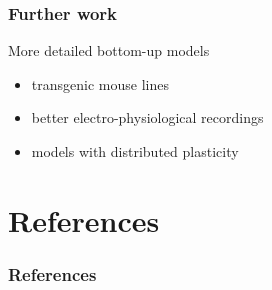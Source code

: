 \documentclass[10pt, compress]{beamer}
\begin{document}
\begin{frame}[fragile]
  \frametitle{Further work}
  More detailed bottom-up models
  \begin{itemize}
    \item transgenic mouse lines
    \item better electro-physiological recordings
    \item models with distributed plasticity
  \end{itemize}
\end{frame}

\section{References}

\begin{frame}[fragile]
  \frametitle{References}
  
\end{frame}

\end{document}
